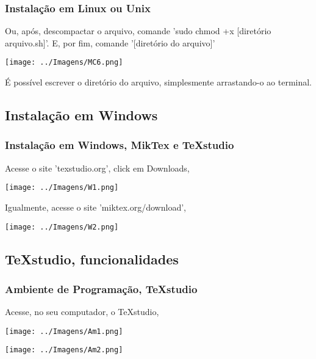 \documentclass[9pt]{beamer}
\begin{document}
\begin{frame}
  \frametitle{Instalação em Linux ou Unix}
  \begin{tcolorbox}[sharp corners, shadow={2mm}{-1mm}{0mm}{black!50!white}]
    Ou, após, descompactar o arquivo, comande 'sudo chmod +x [diretório
    arquivo.sh]'. E, por fim, comande '[diretório do arquivo]'
  \end{tcolorbox}
  \begin{center}
    \texttt{[image: ../Imagens/MC6.png]}
  \end{center}

  É possível escrever o diretório do arquivo, simplesmente
  arrastando-o ao terminal.

\end{frame}


\begin{frame}

  \section{Instalação em Windows}

  \frametitle{Instalação em Windows, MikTex e TeXstudio}

  \begin{tcolorbox}[fontupper=\fontsize{3.7mm}{3.7mm}, size=small, sharp corners]
    Acesse o site 'texstudio.org', click em Downloads,
  \end{tcolorbox}

  \begin{center}
    \texttt{[image: ../Imagens/W1.png]}
  \end{center}

  \pause

  \begin{tcolorbox}[fontupper=\fontsize{3.5mm}{3.5mm}, size=small, sharp corners]
    Igualmente, acesse o site 'miktex.org/download',
  \end{tcolorbox}

  \begin{center}
    \texttt{[image: ../Imagens/W2.png]}
  \end{center}

\end{frame}



\begin{frame}

  \section{TeXstudio, funcionalidades}
  \frametitle{Ambiente de Programação, TeXstudio}
  Acesse, no seu computador, o TeXstudio,
  \begin{center}
    \texttt{[image: ../Imagens/Am1.png]}
  \end{center}

  \pause

  \begin{center}
    \texttt{[image: ../Imagens/Am2.png]}
  \end{center}


\end{frame}
\end{document}
